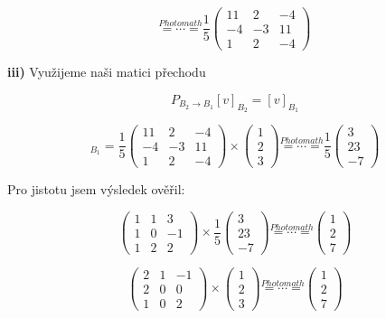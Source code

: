 \documentclass[10pt,a4paper]{article}
\begin{document}
\begin{equation*}
\overset{Photomath}{= \cdots =} \frac15
\begin{pmatrix}
11 & 2 & -4 \\
-4 & -3& 11 \\
1  & 2 & -4
\end{pmatrix}
\end{equation*}

\textbf{iii)} Využijeme naši matici přechodu 

\begin{equation*}
P_{B_2 \to B_1}[v]_{B_2} = [v]_{B_1}
\end{equation*}


\begin{equation*}
[v]_{B_1} = \frac15
\begin{pmatrix}
11 & 2 & -4 \\
-4 & -3& 11 \\
1  & 2 & -4
\end{pmatrix}
\times
\begin{pmatrix}
1 \\ 2 \\3
\end{pmatrix}
\overset{Photomath}{= \cdots =} \frac15
\begin{pmatrix}
3 \\ 23 \\ -7
\end{pmatrix}
\end{equation*}

Pro jistotu jsem výsledek ověřil:

\begin{equation*}
\begin{pmatrix}
1 & 1 & 3 \\
1 & 0 & -1 \\
1 & 2 & 2 
\end{pmatrix} \times \frac15
\begin{pmatrix}
3 \\ 23 \\ -7
\end{pmatrix}\overset{Photomath}{= \cdots =}
\begin{pmatrix}
1 \\ 2 \\ 7
\end{pmatrix} 
\end{equation*}


\begin{equation*}
\begin{pmatrix}
2 & 1 & -1 \\
2 & 0 & 0 \\
1 & 0 & 2 
\end{pmatrix} \times 
\begin{pmatrix}
1 \\ 2 \\ 3
\end{pmatrix}\overset{Photomath}{= \cdots =}
\begin{pmatrix}
1 \\ 2 \\ 7
\end{pmatrix} 
\end{equation*}
\end{document}

